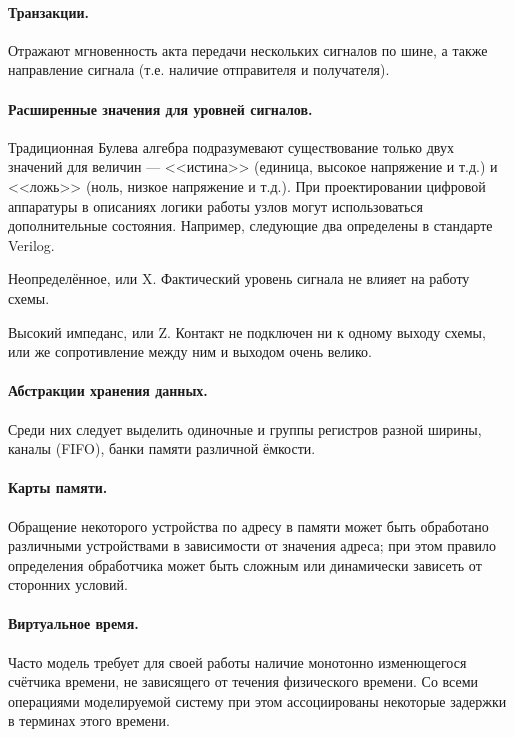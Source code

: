 \paragraph{Транзакции.} Отражают мгновенность акта передачи нескольких сигналов по шине, а также направление сигнала (т.е. наличие отправителя и получателя).

\paragraph{Расширенные значения для уровней сигналов.} Традиционная Булева алгебра подразумевают существование только двух значений для величин --- <<истина>> (единица, высокое напряжение и т.д.) и <<ложь>> (ноль, низкое напряжение и т.д.). При проектировании цифровой аппаратуры в описаниях логики работы узлов могут использоваться дополнительные состояния. Например, следующие два определены в стандарте Verilog.
\begin{enumerate*}
\item Неопределённое, или X. Фактический уровень сигнала не влияет на работу схемы.
\item Высокий импеданс, или Z. Контакт не подключен ни к одному выходу схемы, или же сопротивление между ним и выходом очень велико.
\end{enumerate*}

\paragraph{Абстракции хранения данных.} Среди них следует выделить одиночные и группы регистров разной ширины, каналы (FIFO), банки памяти различной ёмкости.

\paragraph{Карты памяти.} Обращение некоторого устройства по адресу в памяти может быть обработано различными устройствами в зависимости от значения адреса; при этом правило определения обработчика может быть сложным или динамически зависеть от сторонних условий.


\paragraph{Виртуальное время.} Часто модель требует для своей работы наличие монотонно изменющегося счётчика времени, не зависящего от течения физического времени. Со всеми операциями моделируемой систему при этом ассоциированы некоторые задержки в терминах этого времени.

